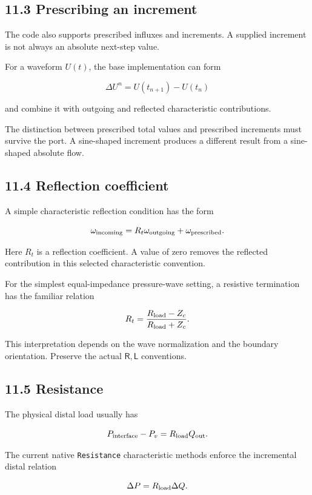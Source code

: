 \documentclass[11pt,a4paper]{article}
\begin{document}
\subsection{11.3 Prescribing an increment}
The code also supports prescribed influxes and increments. A supplied increment is not always an absolute next-step value.

For a waveform \(U(t)\), the base implementation can form


\begingroup\small
\[
\Delta U^n=U(t_{n+1})-U(t_n)
\]
\endgroup


and combine it with outgoing and reflected characteristic contributions.

The distinction between prescribed total values and prescribed increments must survive the port. A sine-shaped increment produces a different result from a sine-shaped absolute flow.

\subsection{11.4 Reflection coefficient}
A simple characteristic reflection condition has the form


\begingroup\small
\[
\omega_{\rm incoming}
=R_t\omega_{\rm outgoing}
+\omega_{\rm prescribed}.
\]
\endgroup


Here \(R_t\) is a reflection coefficient. A value of zero removes the reflected contribution in this selected characteristic convention.

For the simplest equal-impedance pressure-wave setting, a resistive termination has the familiar relation


\begingroup\small
\[
R_t=\frac{R_{\rm load}-Z_c}{R_{\rm load}+Z_c}.
\]
\endgroup


This interpretation depends on the wave normalization and the boundary orientation. Preserve the actual \(\mathsf R,\mathsf L\) conventions.

\subsection{11.5 Resistance}
The physical distal load usually has


\begingroup\small
\[
P_{\rm interface}-P_v=R_{\rm load}Q_{\rm out}.
\]
\endgroup


The current native \texttt{Resistance} characteristic methods enforce the incremental distal relation


\begingroup\small
\[
\Delta P=R_{\rm load}\Delta Q.
\]
\endgroup
\end{document}
